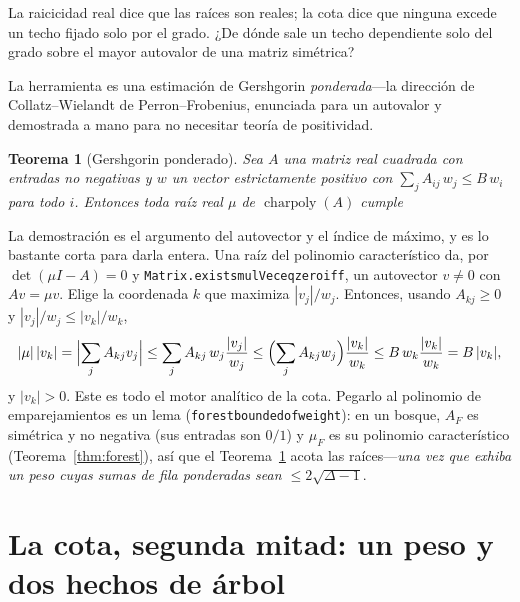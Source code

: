\documentclass[11pt]{article}
\newtheorem{theorem}{Teorema}
\newcommand{\lean}[1]{{\def\_{\textunderscore\allowbreak}\texttt{#1}}}
\newcommand{\keyeq}[1]{\begin{center}\keybox{$\displaystyle #1$}\end{center}}
\begin{document}
La raicicidad real dice que las ra\'ices son reales; la cota dice que ninguna excede
un techo fijado solo por el grado. ¿De d\'onde sale un techo dependiente solo del
grado sobre el mayor autovalor de una matriz sim\'etrica?

La herramienta es una estimaci\'on de Gershgorin \emph{ponderada}---la direcci\'on
de Collatz--Wielandt de Perron--Frobenius, enunciada para un autovalor y demostrada
a mano para no necesitar teor\'ia de positividad.

\begin{theorem}[Gershgorin ponderado]
\label{thm:cw}
Sea $A$ una matriz real cuadrada con entradas no negativas y $w$ un vector
estrictamente positivo con $\sum_j A_{ij}\,w_j\le B\,w_i$ para todo $i$. Entonces
toda ra\'iz real $\mu$ de $\operatorname{charpoly}(A)$ cumple
\keyeq{|\mu|\;\le\;B\qquad(\lean{collatzWielandt}).}
\end{theorem}

La demostraci\'on es el argumento del autovector y el \'indice de m\'aximo, y es lo
bastante corta para darla entera. Una ra\'iz del polinomio caracter\'istico da, por
$\det(\mu I-A)=0$ y \lean{Matrix.exists\_mulVec\_eq\_zero\_iff}, un autovector
$v\ne0$ con $Av=\mu v$. Elige la coordenada $k$ que maximiza $|v_j|/w_j$. Entonces,
usando $A_{kj}\ge0$ y $|v_j|/w_j\le|v_k|/w_k$,
\[
  |\mu|\,|v_k|
  =\Bigl|\sum_j A_{kj}v_j\Bigr|
  \le\sum_j A_{kj}\,w_j\frac{|v_j|}{w_j}
  \le\Bigl(\sum_j A_{kj}w_j\Bigr)\frac{|v_k|}{w_k}
  \le B\,w_k\frac{|v_k|}{w_k}=B\,|v_k|,
\]
y $|v_k|>0$. Este es todo el motor anal\'itico de la cota. Pegarlo al polinomio de
emparejamientos es un lema (\lean{forest\_bounded\_of\_weight}): en un bosque, $A_F$
es sim\'etrica y no negativa (sus entradas son $0/1$) y $\mu_F$ es su polinomio
caracter\'istico (Teorema~\ref{thm:forest}), as\'i que el Teorema~\ref{thm:cw} acota
las ra\'ices---\emph{una vez que exhiba un peso cuyas sumas de fila ponderadas sean
$\le 2\sqrt{\Delta-1}$}.

\section{La cota, segunda mitad: un peso y dos hechos de \'arbol}
\label{sec:weight}
\end{document}

